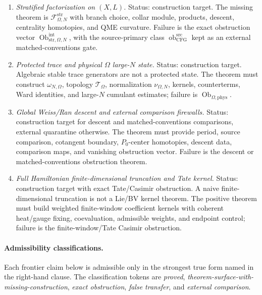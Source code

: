 \begin{enumerate}
  \item \emph{Stratified factorization on \((X,L)\).}
  Status: construction target.  The missing theorem is
  \(\mathcal F^{\mathrm{str}}_{\Omega,N}\) with branch choice, collar
  module, products, descent, centrality homotopies, and QME curvature.
  Failure is the exact obstruction vector
  \(\operatorname{Ob}^{\mathrm{int}}_{\mathrm{str},\Omega,N}\), with the
  source-primary class
  \(\operatorname{ob}^{\mathrm{src}}_{\mathrm{CFG}}\) kept as an external
  matched-conventions gate.

  \item \emph{Protected trace and physical \(\Omega\) large-\(N\) state.}
  Status: construction target.  Algebraic stable trace generators are not
  a protected state.  The theorem must construct \(\omega_{N,\Omega}\),
  topology \(\mathcal T_\Omega\), normalization \(\nu_{\Omega,N}\),
  kernels, counterterms, Ward identities, and large-\(N\) cumulant
  estimates; failure is
  \(\operatorname{Ob}_{\Omega,\mathrm{phys}}\).

  \item \emph{Global Weiss/Ran descent and external comparison firewalls.}
  Status: construction target for descent and matched-conventions
  comparisons, external quarantine otherwise.  The theorem must provide
  period, source comparison, cotangent boundary, \(P_0\)-center
  homotopies, descent data, comparison maps, and vanishing obstruction
  vector.  Failure is the descent or matched-conventions obstruction
  theorem.

  \item \emph{Full Hamiltonian finite-dimensional truncation and Tate
  kernel.}
  Status: construction target with exact Tate/Casimir obstruction.  A
  naive finite-dimensional truncation is not a Lie/BV kernel theorem.
  The positive theorem must build weighted finite-window coefficient
  kernels with coherent heat/gauge fixing, coevaluation, admissible
  weights, and endpoint control; failure is the finite-window/Tate
  Casimir obstruction.
\end{enumerate}

\medskip
\paragraph{Admissibility classifications.}
Each frontier claim below is admissible only in the strongest true
form named in the right-hand clause.  The classification tokens are
\emph{proved}, \emph{theorem-surface-with-missing-construction},
\emph{exact obstruction}, \emph{false transfer}, and
\emph{external comparison}.

